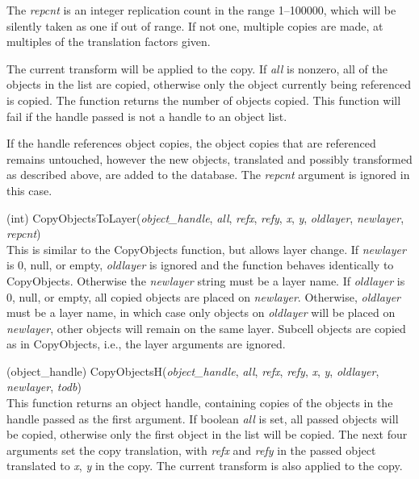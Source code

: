 \begin{description}
The {\it repcnt} is an integer replication count in the range
1--100000, which will be silently taken as one if out of range.  If
not one, multiple copies are made, at multiples of the translation
factors given.

The current transform will be applied to the copy.  If {\it all} is
nonzero, all of the objects in the list are copied, otherwise only the
object currently being referenced is copied.  The function returns the
number of objects copied.  This function will fail if the handle
passed is not a handle to an object list.

If the handle references object copies, the object copies that are
referenced remains untouched, however the new objects, translated and
possibly transformed as described above, are added to the database.
The {\it repcnt} argument is ignored in this case.

\item{(int) \vt CopyObjectsToLayer({\it object\_handle\/}, {\it all\/},
 {\it refx\/}, {\it refy\/}, {\it x\/}, {\it y\/}, {\it oldlayer\/},
 {\it newlayer\/}, {\it repcnt\/})}\\
This is similar to the {\vt CopyObjects} function, but allows layer
change.  If {\it newlayer} is 0, null, or empty, {\it oldlayer} is
ignored and the function behaves identically to {\vt CopyObjects}. 
Otherwise the {\it newlayer} string must be a layer name.  If {\it
oldlayer} is 0, null, or empty, all copied objects are placed on {\it
newlayer\/}.  Otherwise, {\it oldlayer} must be a layer name, in which
case only objects on {\it oldlayer} will be placed on {\it
newlayer\/}, other objects will remain on the same layer.  Subcell
objects are copied as in {\vt CopyObjects}, i.e., the layer arguments
are ignored.

\item{(object\_handle) \vt CopyObjectsH({\it object\_handle\/}, {\it all\/},
 {\it refx\/}, {\it refy\/}, {\it x\/}, {\it y\/}, {\it oldlayer\/},
 {\it newlayer\/}, {\it todb\/})}\\
This function returns an object handle, containing copies of the
objects in the handle passed as the first argument.  If boolean {\it
all} is set, all passed objects will be copied, otherwise only the
first object in the list will be copied.  The next four arguments set
the copy translation, with {\it refx} and {\it refy} in the passed
object translated to {\it x}, {\it y} in the copy.  The current
transform is also applied to the copy.


\end{description}
